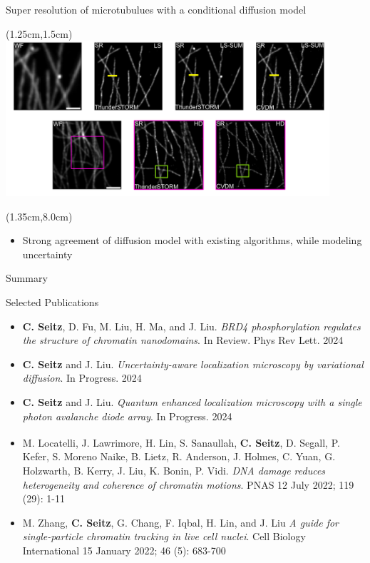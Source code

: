 \documentclass{beamer}					%
\begin{document}
\begin{frame}{Super resolution of microtubulues with a conditional diffusion model}
\begin{textblock*}{12cm}(1.25cm,1.5cm)
\includegraphics[width=12cm]{../../postdoc/sartorius/media/Tubes-Crop.png}
\end{textblock*}
\begin{textblock*}{12cm}(1.35cm,8.0cm)
\begin{itemize}
\item Strong agreement of diffusion model with existing algorithms, while modeling uncertainty
\end{itemize}
\end{textblock*}
\end{frame}

\begin{frame}{Summary}

\end{frame}

\begin{frame}{Selected Publications}

\begin{itemize}

\item \textbf{C. Seitz}, D. Fu, M. Liu, H. Ma, and J. Liu. \textit{BRD4 phosphorylation regulates the structure of chromatin nanodomains}. In Review. Phys Rev Lett. 2024

\item \textbf{C. Seitz} and J. Liu. \textit{Uncertainty-aware localization microscopy by variational diffusion}. In Progress. 2024

\item \textbf{C. Seitz} and J. Liu. \textit{Quantum enhanced localization microscopy with a single photon avalanche diode array}. In Progress. 2024

\item M. Locatelli\textsuperscript{\textdagger}, J. Lawrimore\textsuperscript{\textdagger}, H. Lin\textsuperscript{\textdagger}, S. Sanaullah, \textbf{C. Seitz}, D. Segall, P. Kefer, S. Moreno Naike, B. Lietz, R. Anderson, J. Holmes, C. Yuan, G. Holzwarth, B. Kerry, J. Liu, K. Bonin, P. Vidi. \textit{DNA damage reduces heterogeneity and coherence of chromatin motions}. PNAS 12 July 2022; 119 (29): 1-11

\item M. Zhang, \textbf{C. Seitz}, G. Chang, F. Iqbal, H. Lin, and J. Liu \textit{A guide for single-particle chromatin tracking in live cell nuclei}. Cell Biology International 15 January 2022; 46 (5): 683-700


\end{itemize}
\end{frame}
\end{document}
